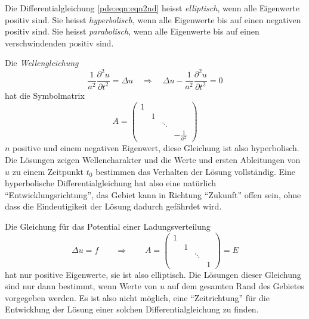 \begin{definition}
Die Differentialgleichung
\eqref{pde:eqn:eqn2nd}
heisst {\em elliptisch}, wenn alle Eigenwerte positiv sind.
Sie heisst {\em hyperbolisch}, wenn alle Eigenwerte bis auf einen negativen
positiv sind.
Sie heisst {\em parabolisch}, wenn alle Eigenwerte bis auf einen
verschwindenden positiv sind.
\end{definition}
%
%
%

\begin{beispiel}
Die {\em Wellengleichung}
\[
\frac{1}{a^2}\frac{\partial^2 u}{\partial t^2}
=
\Delta u 
\quad\Rightarrow\quad
\Delta u 
-
\frac{1}{a^2}\frac{\partial^2 u}{\partial t^2}
=
0
\]
hat die Symbolmatrix
\[
A=
\begin{pmatrix}
1& &      &              \\
 &1&      &              \\
 & &\ddots&              \\
 & &      &\displaystyle-\frac{1}{a^2}
\end{pmatrix}
\]
$n$ positive und einem negativen Eigenwert, diese Gleichung ist also
hyperbolisch.
Die Lösungen zeigen Wellencharakter und die Werte und ersten
Ableitungen von $u$ zu einem Zeitpunkt $t_0$ bestimmen das Verhalten
der Lösung vollständig.
Eine hyperbolische Differentialgleichung hat also eine natürlich
``Entwicklungsrichtung'', das Gebiet kann in Richtung ``Zukunft''
offen sein, ohne dass die Eindeutigikeit der Lösung dadurch gefährdet wird.
\end{beispiel}

\begin{beispiel}
Die Gleichung für das Potential einer Ladungsverteilung
\[
\Delta u = f
\qquad\Rightarrow\qquad
A=
\begin{pmatrix}
1& &      & \\
 &1&      & \\
 & &\ddots& \\
 & &      &1
\end{pmatrix}
=E
\]
hat nur positive Eigenwerte, sie ist also elliptisch.
Die Lösungen dieser Gleichung sind nur dann bestimmt, wenn Werte von $u$
auf dem gesamten Rand des Gebietes vorgegeben werden.
Es ist also nicht möglich, eine ``Zeitrichtung'' für die Entwicklung
der Lösung einer solchen Differentialgleichung zu finden.
\end{beispiel}

